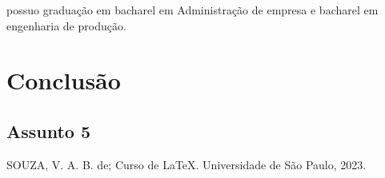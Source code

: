 \documentclass[12pt, a4paper, oneside]{book}
\begin{document}
possuo  graduação em bacharel em Administração de empresa e bacharel  em engenharia de produção.

\chapter{Conclusão}

\section{Assunto 5}

\begin{thebibliography}{1}
 SOUZA, V. A. B. de; Curso de LaTeX. Universidade de São Paulo, 2023.
\end{thebibliography}

\printindex
\end{document}
